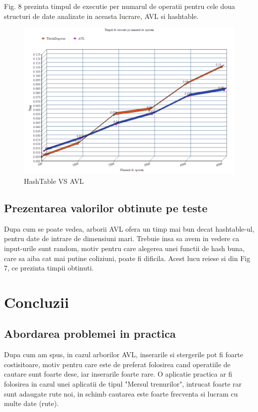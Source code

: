 \documentclass[runningheads]{llncs}
\begin{document}
Fig. 8 prezinta timpul de executie per numarul de operatii pentru cele doua structuri de date analizate in aceasta lucrare, AVL si hashtable.

\begin{figure}[ht!]
\includegraphics[width=150mm]{7.png}
\caption{HashTable VS AVL \label{overflow}}
\end{figure}

\subsection{Prezentarea valorilor obtinute pe teste}
Dupa cum se poate vedea, arborii AVL ofera un timp mai bun decat hashtable-ul, pentru date de intrare de dimensiuni mari. Trebuie insa sa avem in vedere ca input-urile sunt random, motiv pentru care alegerea unei functii de hash buna, care sa aiba cat mai putine coliziuni, poate fi dificila. Acest lucu reiese si din Fig 7, ce prezinta timpii obtinuti.



\section{Concluzii}
\subsection{Abordarea problemei in practica}
Dupa cum am spus, in cazul arborilor AVL, inserarile si stergerile pot fi foarte costisitoare, motiv pentru care este de preferat folosirea cand operatiile de cautare sunt foarte dese, iar inserarile foarte rare. O aplicatie practica ar fi folosirea in cazul unei aplicatii de tipul "Mersul trenurilor", intrucat foarte rar sunt adaugate rute noi, in schimb cautarea este foarte frecventa si lucram cu multe date (rute).
\end{document}
